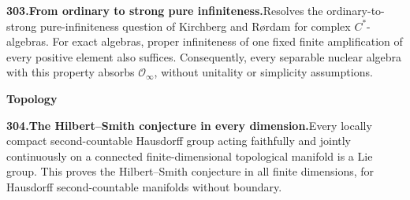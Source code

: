 \documentclass[11pt,a4paper]{article}
\begin{document}
  \par \begin{minipage}{\linewidth}
  \fontsize{10.5}{12.6}\selectfont\RaggedRight
  \hypertarget{result 303}{}
  {\bfseries\textcolor{muted}{303.}\enspace From ordinary to strong pure infiniteness.}\enspace Resolves the ordinary-to-strong pure-infiniteness question of Kirchberg and R{\o}rdam for complex $C^*$-algebras. For exact algebras, proper infiniteness of one fixed finite amplification of every positive element also suffices. Consequently, every separable nuclear algebra with this property absorbs $\mathcal O_\infty$, without unitality or simplicity assumptions.\par
  \end{minipage}\par\vspace{5pt}



  \par{}\addvspace{12pt}
  \hypertarget{subject 4}{}\label{subject 4}
  {\fontsize{15}{18}\selectfont\bfseries Topology\par}
  \nobreak\vspace{9pt}\nobreak



  \par \begin{minipage}{\linewidth}
  \fontsize{10.5}{12.6}\selectfont\RaggedRight
  \hypertarget{result 304}{}
  {\bfseries\textcolor{muted}{304.}\enspace The Hilbert--Smith conjecture in every dimension.}\enspace Every locally compact second-countable Hausdorff group acting faithfully and jointly continuously on a connected finite-dimensional topological manifold is a Lie group. This proves the Hilbert--Smith conjecture in all finite dimensions, for Hausdorff second-countable manifolds without boundary.\par
  \end{minipage}\par\vspace{5pt}
\end{document}
